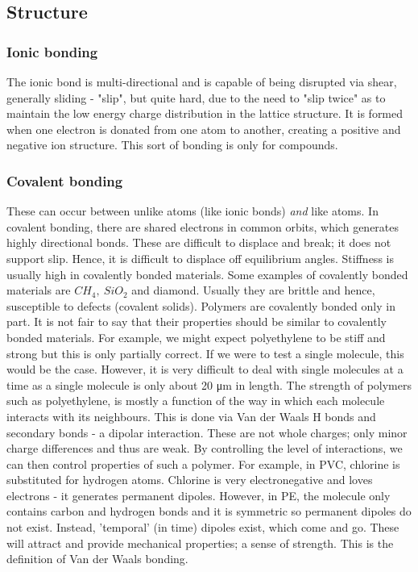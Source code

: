 \subsection{Structure}
\subsubsection{Ionic bonding}
The ionic bond is multi-directional and is capable of being disrupted via shear, generally sliding - "slip", but quite hard, due to the need to "slip twice" as to maintain the low energy charge distribution in the lattice structure. It is formed when one electron is donated from one atom to another, creating a positive and negative ion structure. This sort of bonding is only for compounds.
\subsubsection{Covalent bonding}
These can occur between unlike atoms (like ionic bonds) \emph{and} like atoms. In covalent bonding, there are shared electrons in common orbits, which generates highly directional bonds. These are difficult to displace and break; it does not support slip. Hence, it is difficult to displace off equilibrium angles. Stiffness is usually high in covalently bonded materials. Some examples of covalently bonded materials are \( CH_4, \ SiO_2 \) and diamond. Usually they are brittle and hence, susceptible to defects (covalent solids). Polymers are covalently bonded only in part. It is not fair to say that their properties should be similar to covalently bonded materials. For example, we might expect polyethylene to be stiff and strong but this is only partially correct. If we were to test a single molecule, this would be the case. However, it is very difficult to deal with single molecules at a time as a single molecule is only about 20 \si{\micro\meter} in length. The strength of polymers such as polyethylene, is mostly a function of the way in which each molecule interacts with its neighbours. This is done via Van der Waals H bonds and secondary bonds - a dipolar interaction. These are not whole charges; only minor charge differences and thus are weak. By controlling the level of interactions, we can then control properties of such a polymer. For example, in PVC, chlorine is substituted for hydrogen atoms. Chlorine is very electronegative and loves electrons - it generates permanent dipoles. However, in PE, the molecule only contains carbon and hydrogen bonds and it is symmetric so permanent dipoles do not exist. Instead, 'temporal' (in time) dipoles exist, which come and go. These will attract and provide mechanical properties; a sense of strength. This is the definition of Van der Waals bonding.
